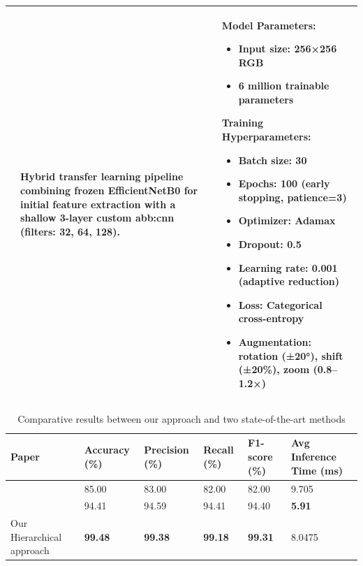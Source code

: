 \begin{table}[H]
\begin{tabular}{|p{2.5cm}|p{5cm}|p{5.5cm}|}
\textit{\parencite{jouini2024wheat}} & 
Hybrid transfer learning pipeline combining frozen EfficientNetB0 for initial feature extraction with a shallow 3-layer custom \gls{abb:cnn} (filters: 32, 64, 128). & 
\textbf{Model Parameters:}
\begin{itemize}[leftmargin=*,noitemsep]
    \item Input size: 256×256 RGB
    \item 6 million trainable parameters
\end{itemize}
\textbf{Training Hyperparameters:}
\begin{itemize}[leftmargin=*,noitemsep]
    \item Batch size: 30
    \item Epochs: 100 (early stopping, patience=3)
    \item Optimizer: Adamax
    \item Dropout: 0.5
    \item Learning rate: 0.001 (adaptive reduction)
    \item Loss: Categorical cross-entropy
    \item Augmentation: rotation (±20°), shift (±20\%), zoom (0.8–1.2×)
\end{itemize} \\
\hline

\end{tabular}
\end{table}



\begin{table}[H]
\centering
\renewcommand{\arraystretch}{1.3}
\setlength{\tabcolsep}{6pt}
\caption{Comparative results between our approach and two state-of-the-art methods}
\begin{tabular}{|p{3cm}|p{2cm}|p{2cm}|p{2cm}|p{2cm}|p{2.5cm}|}
\hline
\textbf{Paper} & \textbf{Accuracy (\%)} & \textbf{Precision (\%)} & \textbf{Recall (\%)} & \textbf{F1-score (\%)} & \textbf{Avg Inference Time (ms)} \\
\hline
\parencite{fang2023lightweight}  & 85.00 & 83.00 & 82.00 & 82.00 & 9.705 \\
\hline
\parencite{jouini2024wheat}  & 94.41 & 94.59 & 94.41 &  94.40 & \textbf{5.91}\\
\hline
 Our Hierarchical approach & \textbf{99.48} & \textbf{99.38} & \textbf{99.18} & \textbf{99.31} & 8.0475 \\
\hline
\end{tabular}
\label{tab:comparison_state_of_art}
\end{table}




